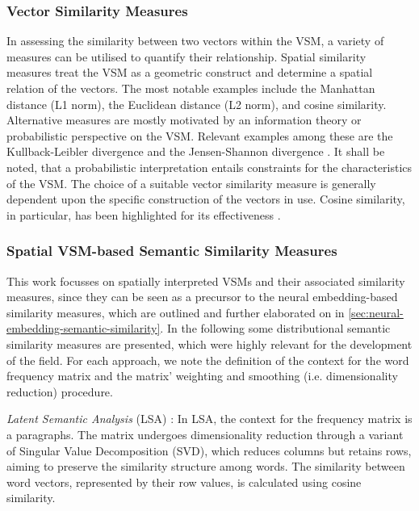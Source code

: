 \documentclass[11pt, numbers=noenddot]{scrreprt}
\let\cite\parencite  %
\begin{document}
\subsubsection{Vector Similarity Measures}
In assessing the similarity between two vectors within the VSM, a variety of measures can be utilised to quantify their relationship. Spatial similarity measures treat the VSM as a geometric construct and determine a spatial relation of the vectors. The most notable examples include the Manhattan distance (L1 norm), the Euclidean distance (L2 norm), and cosine similarity. Alternative measures are mostly motivated by an information theory or probabilistic perspective on the VSM. Relevant examples among these are the Kullback-Leibler divergence and the Jensen-Shannon divergence \cite{mohammadDistributionalMeasuresSemantic2012}. It shall be noted, that a probabilistic interpretation entails constraints for the characteristics of the VSM. The choice of a suitable vector similarity measure is generally dependent upon the specific construction of the vectors in use. Cosine similarity, in particular, has been highlighted for its effectiveness \cite{mohammadDistributionalMeasuresProxies2012, turneyFrequencyMeaningVector2010}. 

\subsubsection{Spatial VSM-based Semantic Similarity Measures}
This work focusses on spatially interpreted VSMs and their associated similarity measures, since they can be seen as a precursor to the neural embedding-based similarity measures, which are outlined and further elaborated on in \cref{sec:neural-embedding-semantic-similarity}.
In the following some distributional semantic similarity measures are presented, which were highly relevant for the development of the field. For each approach, we note the definition of the context for the word frequency matrix and the matrix' weighting and smoothing  (i.e. dimensionality reduction) procedure. 

\textit{Latent Semantic Analysis} (LSA) \cite{deerwesterIndexingLatentSemantic1990, landauerSolutionPlatoProblem1997, landauerIntroductionLatentSemantic1998}: In LSA, the context for the frequency matrix is a paragraphs. The matrix undergoes dimensionality reduction through a variant of Singular Value Decomposition (SVD), which reduces columns but retains rows, aiming to preserve the similarity structure among words. The similarity between word vectors, represented by their row values, is calculated using cosine similarity.
\end{document}
